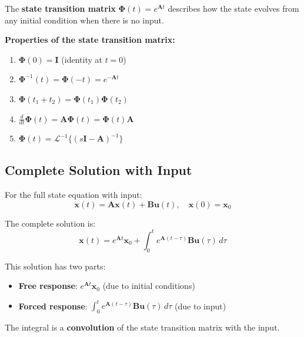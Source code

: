 \begin{definition}
The \textbf{state transition matrix} $\boldsymbol{\Phi}(t) = e^{\mathbf{A}t}$ describes how the state evolves from any initial condition when there is no input.
\end{definition}

\textbf{Properties of the state transition matrix:}
\begin{enumerate}
    \item $\boldsymbol{\Phi}(0) = \mathbf{I}$ (identity at $t=0$)
    \item $\boldsymbol{\Phi}^{-1}(t) = \boldsymbol{\Phi}(-t) = e^{-\mathbf{A}t}$
    \item $\boldsymbol{\Phi}(t_1 + t_2) = \boldsymbol{\Phi}(t_1)\boldsymbol{\Phi}(t_2)$
    \item $\frac{d}{dt}\boldsymbol{\Phi}(t) = \mathbf{A}\boldsymbol{\Phi}(t) = \boldsymbol{\Phi}(t)\mathbf{A}$
    \item $\boldsymbol{\Phi}(t) = \mathcal{L}^{-1}\{(s\mathbf{I} - \mathbf{A})^{-1}\}$
\end{enumerate}

\subsection{Complete Solution with Input}

For the full state equation with input:
\begin{equation}
\dot{\mathbf{x}}(t) = \mathbf{A}\mathbf{x}(t) + \mathbf{B}\mathbf{u}(t), \quad \mathbf{x}(0) = \mathbf{x}_0
\end{equation}

The complete solution is:
\begin{equation}
\boxed{\mathbf{x}(t) = e^{\mathbf{A}t}\mathbf{x}_0 + \int_0^t e^{\mathbf{A}(t-\tau)}\mathbf{B}\mathbf{u}(\tau)\,d\tau}
\label{eq:state_solution}
\end{equation}

This solution has two parts:
\begin{itemize}
    \item \textbf{Free response}: $e^{\mathbf{A}t}\mathbf{x}_0$ (due to initial conditions)
    \item \textbf{Forced response}: $\int_0^t e^{\mathbf{A}(t-\tau)}\mathbf{B}\mathbf{u}(\tau)\,d\tau$ (due to input)
\end{itemize}

The integral is a \textbf{convolution} of the state transition matrix with the input.


